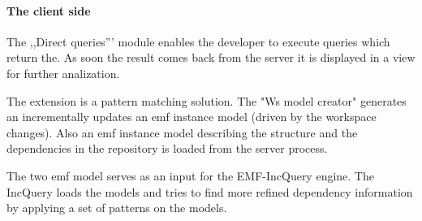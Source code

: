 \paragraph{The client side} The ,,Direct queries''' module enables the developer
to execute queries which return the. As soon the result comes back from the
server it is displayed in a view for further analization.

The extension is a pattern matching solution. The "Ws model creator" generates
an incrementally updates an emf instance model (driven by the workspace
changes). Also an emf instance model describing the structure and the
dependencies in the repository is loaded from the server process.

The two emf model serves as an input for the EMF-IncQuery engine. The IncQuery 
loads the models and tries to find more refined dependency information by applying
a set of patterns on the models. 